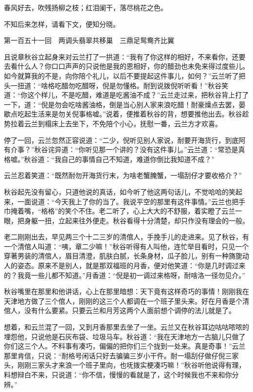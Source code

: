 \documentclass[12pt,UTF8]{ctexbook}
\begin{document}
{{{春风好去，吹残扬柳之枝；红泪阑干，落尽桃花之色。

不知后来怎样，请看下文，便知分晓。





第一百五十一回　两调头翡翠共移巢　三鼎足鸳鸯齐比翼



且说章秋谷立起身来对云兰打了一拱道：“我有了你这样的相好，不来看你，还要去看什么人？你口口声声的只说他是我的恩相好，你的醋劲也未免来得过度些儿。如今就算我的不是，向你陪个礼儿，以后不要提起这件事儿，如何？”云兰听了把头一扭道：“啥格吃醋勿吃醋呀，倪是勿懂格。耐到说拨倪听听看！”秋谷笑道：“你这个样儿，不是吃醋，难道是吃酱油不成？”云兰走过来，把秋谷背上打了一下，道：“倪是勿会吃啥酱油格，倒是当心别人家来浪吃醋！耐豪燥点去罢，晏歇点吃起生活来是勿关倪事格嘘。”说着，便推着秋谷的背，想要推他出去。秋谷趁势拉着云兰到榻床上去坐下，不免陪个小心，抚慰一番，云兰方才欢喜。

停了一回，云兰忽然正容说道：“二少，倪听见别人家说，耐要开海货行，到底阿有介事？”秋谷诧异道：“你听见那一个讲的？没有这件事儿。”云兰道：“常恐是真格嘘。”秋谷道：“我自己的事情自己不知道，难道你倒比我知道不成？”

云兰忍着笑道：“既然耐勿开海货行末，为啥老蟹腌蟹，一塌刮仔才要收格介？”

秋谷起先没有留心，只道他说的真话，如今听了他这两句话儿，不觉哈哈的笑起来，一面说道：“今天我上了你的当了。我说平空的那里有这件事情。”云兰也把手巾掩着嘴，“格格”的笑个不住。老二听了，心上大大的不舒服，着实瞪了云兰一眼，把身躯一扭，立起来往外便走。秋谷看得十分清楚，却只作没有理会的一般。

老二刚刚出去，早见两三个十二三岁的清倌人，手挽手儿的走进来。见了秋谷，有一个清倌人叫道：“咦，章二少嘛！”秋谷听得有人叫他，连忙举目看时，只见一个穿著男装的清倌人，眉目清澄，肌肤白腻，长条身材，瓜子脸儿，别有一种旖旎动人的姿态。原来不是别人，就是那双福班的月香，便对他笑道：“你是几时调过来的？我竟一些儿都不知道。”月香道：“倪是初一调过来格呀，耐啥洛一径勿见介。”

秋谷嘴里在那里和他讲话，心上在那里暗想：天下竟有这样奇巧的事情！刚刚我在天津地方做了三个倌人，刚刚的这三个人都调在一个班子里头来。好在月香是个清倌人，没有什么要紧。只要云兰和月芳这两个人面前想个调停的法儿就是了。

想着，和云兰混了一回，又到月香那里去坐了一坐。云兰又在秋谷耳边咕咕哝哝的埋怨他，只说他是石灰布袋、垃圾马车。秋谷道：“我在天津地方一古脑儿只做了你们这三个人。不料事有凑巧，偏偏的把你们三个拢到一处来。真是奇事！”云兰那里肯信，只说：“耐格号闲话只好去骗骗三岁小干仵。耐一塌刮仔做仔倪三家头，刚刚三家头才来浪一个班子里向，也呒拨实梗凑巧嘛！”秋谷听他说得有理，料想辩白不来，只说道：“你不信，慢慢的看就是了，这个时候我也不来和你分辨。”

}}}
\end{document}
